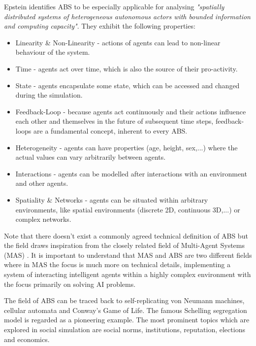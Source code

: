 Epstein \cite{epstein_generative_2012} identifies ABS to be especially applicable for analysing \textit{"spatially distributed systems of heterogeneous autonomous actors with bounded information and computing capacity"}. They exhibit the following properties:

\begin{itemize}
	\item Linearity \& Non-Linearity - actions of agents can lead to non-linear behaviour of the system.
	\item Time - agents act over time, which is also the source of their pro-activity.
	\item State - agents encapsulate some state, which can be accessed and changed during the simulation.
	\item Feedback-Loop - because agents act continuously and their actions influence each other and themselves in the future of subsequent time steps, feedback-loops are a fundamental concept, inherent to every ABS. 
	\item Heterogeneity - agents can have properties (age, height, sex,...) where the actual values can vary arbitrarily between agents.
	\item Interactions - agents can be modelled after interactions with an environment and other agents.
	\item Spatiality \& Networks - agents can be situated within arbitrary environments, like spatial environments (discrete 2D, continuous 3D,...) or complex networks.
\end{itemize}

Note that there doesn't exist a commonly agreed technical definition of ABS but the field draws inspiration from the closely related field of Multi-Agent Systems (MAS) \cite{weiss_multiagent_2013,wooldridge_introduction_2009}. It is important to understand that MAS and ABS are two different fields where in MAS the focus is much more on technical details, implementing a system of interacting intelligent agents within a highly complex environment with the focus primarily on solving AI problems.

\medskip

The field of ABS can be traced back to self-replicating von Neumann machines, cellular automata and Conway's Game of Life. The famous Schelling segregation model \cite{schelling_dynamic_1971} is regarded as a pioneering example. The most prominent topics which are explored in social simulation are social norms, institutions, reputation, elections and economics.

